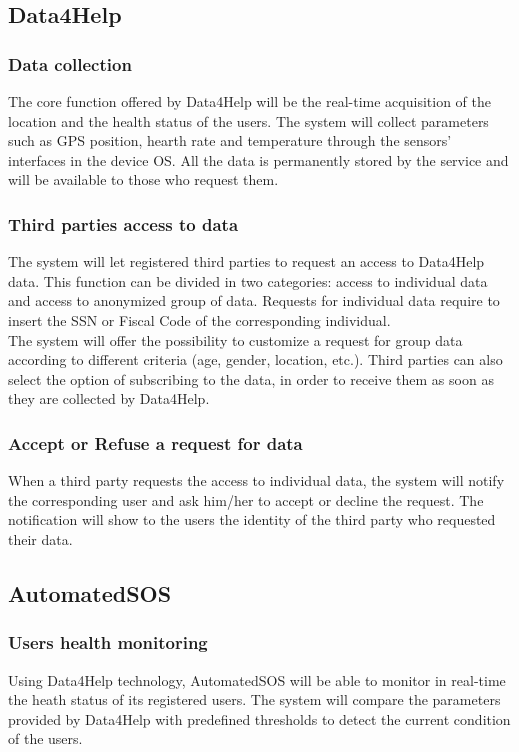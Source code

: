     \subsection{Data4Help}
        \subsubsection {Data collection}
            The core function offered by Data4Help will be the real-time acquisition of the location and the health status of the users. The system will collect parameters such as GPS position, hearth rate and temperature through the sensors' interfaces in the device OS.
            All the data is permanently stored by the service and will be available to those who request them.
        
        \subsubsection {Third parties access to data}
            The system will let registered third parties to request an access to Data4Help data. This function can be divided in two categories: access to individual data and access to anonymized group of data. 
            Requests for individual data require to insert the SSN or Fiscal Code of the corresponding individual. \\
            The system will offer the possibility to customize a request for group data according to different criteria (age, gender, location, etc.).
            Third parties can also select the option of subscribing to the data, in order to receive them as soon as they are collected by Data4Help.
        
        \subsubsection {Accept or Refuse a request for data}
            When a third party requests the access to individual data, the system will notify the corresponding user and ask him/her to accept or decline the request. 
            The notification will show to the users the identity of the third party who requested their data.
        
    \subsection{AutomatedSOS}
        \subsubsection{Users health monitoring}
            Using Data4Help technology, AutomatedSOS will be able to monitor in real-time the heath status of its registered users. 
            The system will compare the parameters provided by Data4Help with predefined thresholds to detect the current condition of the users.
        
